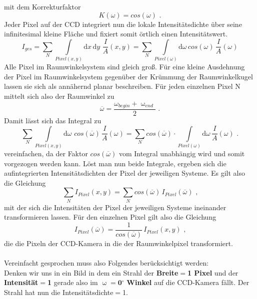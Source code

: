 mit dem Korrekturfaktor
\begin{equation}
K(\omega)=cos (\omega) \text{ .}
\end{equation}
Jeder Pixel auf der CCD integriert nun die lokale Intensitätsdichte über seine infinitesimal kleine Fläche und fixiert somit örtlich einen Intensitätswert.
\begin{equation}
I_{ges}= \sum_N \int \limits_{Pixel(x,y) } \! \mathrm{d}x \, \mathrm{d}y \,\, \frac{I}{A}(x,y) = \sum_N \int \limits_{Pixel(\omega)} \! \mathrm{d}\omega \, cos(\omega) \, \frac{I}{A}(\omega)
\end{equation}
Alle Pixel im Raumwinkelsystem sind gleich groß. Für eine kleine Ausdehnung der Pixel im Raumwinkelsystem gegenüber der Krümmung der Raumwinkelkugel lassen sie sich als annähernd planar beschreiben.  
Für jeden einzelnen Pixel N mittelt sich also der Raumwinkel zu
\begin{equation}
\overline{\omega} = \frac{\omega_{begin} + \upomega_{end}}{2} \text{ .}
\end{equation}
Damit lässt sich das Integral zu
\begin{equation}
\sum_N \int \limits_{Pixel(x,y)} \! \mathrm{d}\omega \,\, cos(\overline{\omega}) \, \frac{I}{A}(\omega) = \sum_N  cos(\overline{\omega})  \cdot \int  \limits_{Pixel(\omega)} \! \mathrm{d}\omega  \, \frac{I}{A}(\omega) \text{ .}
\end{equation}
vereinfachen, da der Faktor $cos(\overline{\omega})$ vom Integral unabhängig wird und somit vorgezogen werden kann. Löst man nun beide Integrale, ergeben sich die aufintegrierten Intensitätsdichten der Pixel der jeweiligen Systeme. Es gilt also die Gleichung
\begin{equation}
\sum_N I_{Pixel}(x,y) = \sum_N cos(\overline{\omega}) \, I_{Pixel}(\overline{\omega})  \text{ ,}
\end{equation}
mit der sich die Intensitäten der Pixel der jeweiligen Systeme ineinander transformieren lassen. Für den einzelnen Pixel gilt also die Gleichung
\begin{equation}
I_{Pixel}(\overline{\omega}) = \frac{1}{cos(\overline{\omega})} \, I_{Pixel}(x,y) \text{ ,} 
\label{Korr2}
\end{equation}
die die Pixeln der CCD-Kamera in die der Raumwinkelpixel transformiert.\\
\\
Vereinfacht gesprochen muss also Folgendes berücksichtigt werden:\\ 
Denken wir uns in ein Bild in dem ein Strahl der \textbf{Breite$=$1 Pixel} und der \textbf{Intensität$=$1} gerade also im $\upomega=\textbf{0$^\circ$}$ \textbf{Winkel} auf die CCD-Kamera fällt. Der Strahl hat nun die Intensitätsdichte$=$1.\\

